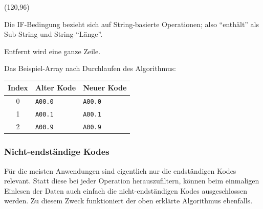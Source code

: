\begin{struktogramm}(120,96)
    \change
    \ifend
    \whileend
\end{struktogramm}

Die IF-Bedingung bezieht sich auf String-basierte Operationen; also ``enthält'' als Sub-String und String-``Länge''.

Entfernt wird eine ganze Zeile. 

\newpage

Das Beispiel-Array nach Durchlaufen des Algorithmus: 

\begingroup
\renewcommand{\arraystretch}{1.2}
\setlength{\tabcolsep}{12pt}
\begin{tabular}{cll}
Index & Alter Kode & Neuer Kode \\
\hline
0 & \texttt{A00.0} & \texttt{A00.0} \\
1 & \texttt{A00.1} & \texttt{A00.1} \\
2 & \texttt{A00.9} & \texttt{A00.9} \\
\end{tabular}
\endgroup

\subsubsection{Nicht-endständige Kodes}

Für die meisten Anwendungen sind eigentlich nur die endständigen Kodes relevant. Statt diese bei jeder Operation herauszufiltern, können beim einmaligen Einlesen der Daten auch einfach die nicht-endständigen Kodes ausgeschlossen werden. Zu diesem Zweck funktioniert der oben erklärte Algorithmus ebenfalls. 

